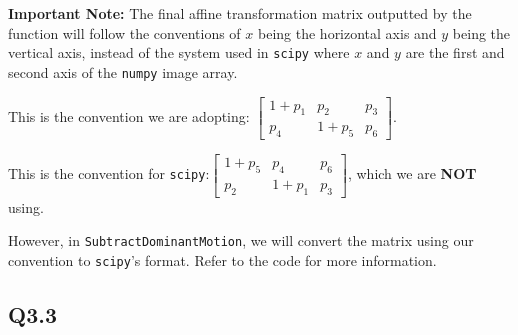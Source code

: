 \documentclass{article} %
\begin{document}
    \textbf{Important Note:} The final affine transformation matrix outputted by the function will follow the conventions of $x$ being the horizontal axis and $y$ being the vertical axis, instead of the system used in \verb|scipy| where $x$ and $y$ are the first and second axis of the \verb|numpy| image array.
    \medskip

    This is the convention we are adopting: $\left[\begin{array}{ccc}1+p_{1} & p_{2} & p_{3}\\p_{4} & 1+p_{5} & p_{6}\end{array}\right]$.
    \medskip

    This is the convention for \verb|scipy|:$\left[\begin{array}{ccc}1+p_{5} & p_{4} & p_{6}\\p_{2} & 1+p_{1} & p_{3}\end{array}\right]$, which we are \textbf{NOT} using. 
    \medskip
    
    However, in \verb|SubtractDominantMotion|, we will convert the matrix using our convention to \verb|scipy|'s format. Refer to the code for more information.

    \subsection*{Q3.3}
    
\end{document}
